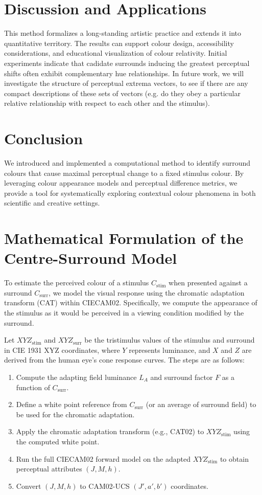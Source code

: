 \documentclass[11pt]{article}
\begin{document}
\section{Discussion and Applications}

This method formalizes a long-standing artistic practice and extends it into quantitative territory. The results can support colour design, accessibility considerations, and educational visualization of colour relativity. Initial experiments indicate that cadidate surrounds inducing the greatest perceptual shifts often exhibit complementary hue relationships. In future work, we will investigate the structure of perceptual extrema vectors, to see if there are any compact descriptions of these sets of vectors (e.g. do they obey a particular relative relationship with respect to each other and the stimulus).

\section{Conclusion}

We introduced and implemented a computational method to identify surround colours that cause maximal perceptual change to a fixed stimulus colour. By leveraging colour appearance models and perceptual difference metrics, we provide a tool for systematically exploring contextual colour phenomena in both scientific and creative settings.

\appendix
\section{Mathematical Formulation of the Centre-Surround Model}

To estimate the perceived colour of a  stimulus $C_{\text{stim}}$ when presented against a surround $C_{\text{surr}}$, we model the visual response using the chromatic adaptation transform (CAT) within CIECAM02. Specifically, we compute the appearance of the stimulus as it would be perceived in a viewing condition modified by the surround.

Let $XYZ_{\text{stim}}$ and $XYZ_{\text{surr}}$ be the tristimulus values of the stimulus and surround in CIE 1931 XYZ coordinates, where $Y$ represents luminance, and $X$ and $Z$ are derived from the human eye's cone response curves. The steps are as follows:

\begin{enumerate}
  \item Compute the adapting field luminance $L_A$ and surround factor $F$ as a function of $C_{\text{surr}}$.
  \item Define a white point reference from $C_{\text{surr}}$ (or an average of surround field) to be used for the chromatic adaptation.
  \item Apply the chromatic adaptation transform (e.g., CAT02) to $XYZ_{\text{stim}}$ using the computed white point.
  \item Run the full CIECAM02 forward model on the adapted $XYZ_{\text{stim}}$ to obtain perceptual attributes $(J, M, h)$.
  \item Convert $(J, M, h)$ to CAM02-UCS $(J', a', b')$ coordinates.
\end{enumerate}
\end{document}
